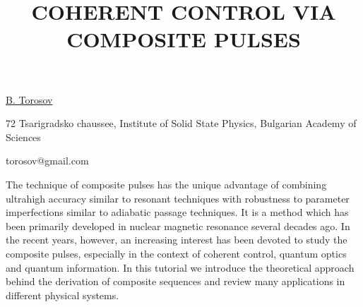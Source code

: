 \title{COHERENT CONTROL VIA COMPOSITE PULSES}

\underline{B. Torosov}  

{\normalsize{\vspace{-4mm}
72 Tsarigradsko chaussee, Institute of Solid State Physics, Bulgarian Academy of Sciences



\email torosov@gmail.com}}

The technique of composite pulses has the unique advantage of combining ultrahigh accuracy similar to resonant techniques with robustness to parameter imperfections similar to adiabatic passage techniques. It is a method which has been primarily developed in nuclear magnetic resonance several decades ago. In the recent years, however, an increasing interest has been devoted to study the composite pulses, especially in the context of coherent control, quantum optics and quantum information. In this tutorial we introduce the theoretical approach behind the derivation of composite sequences and review many applications in different physical systems.

\vspace{\baselineskip}